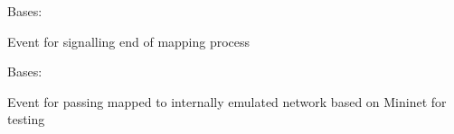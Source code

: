 \documentclass[letterpaper,10pt,english]{sphinxmanual}
\begin{document}
\begin{fulllineitems}
\label{adapt/cas_API:escape.adapt.cas_API.InstallationFinishedEvent}
Bases: 

Event for signalling end of mapping process

\begin{fulllineitems}
\label{adapt/cas_API:escape.adapt.cas_API.InstallationFinishedEvent.__init__}
\end{fulllineitems}


\end{fulllineitems}


\begin{fulllineitems}
\label{adapt/cas_API:escape.adapt.cas_API.DeployNFFGEvent}
Bases: 

Event for passing mapped {\hyperref[util/nffg:escape.util.nffg.NFFG]{\emph{}}} to internally emulated network based on
Mininet for testing

\begin{fulllineitems}
\label{adapt/cas_API:escape.adapt.cas_API.DeployNFFGEvent.__init__}
\end{fulllineitems}


\end{fulllineitems}

\end{document}
